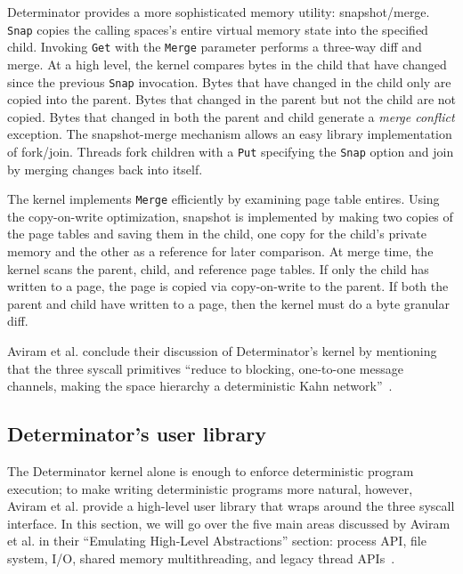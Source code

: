 Determinator provides a more sophisticated memory utility: snapshot/merge.
{\tt Snap} copies the calling spaces's entire virtual memory state into the
specified child. Invoking {\tt Get} with the {\tt Merge} parameter performs a
three-way diff and merge. At a high level, the kernel compares bytes
in the child that have changed since the previous {\tt Snap} invocation. Bytes
that have changed in the child only are copied into the parent. Bytes that
changed in the parent but not the child are not copied.
Bytes that changed in both the parent and child generate a
\emph{merge conflict} exception. The snapshot-merge mechanism allows an easy
library implementation of fork/join. Threads fork children with a
{\tt Put} specifying the {\tt Snap} option and join by merging changes back into
itself.

The kernel implements {\tt Merge} efficiently by examining page table entires.
Using the copy-on-write optimization, snapshot is implemented by making two
copies of the page tables and saving them in the child, one copy for the child's
private memory and the other as a reference for later comparison. At merge time,
the kernel scans the parent, child, and reference page tables. If only the child
has written to a page, the page is copied via copy-on-write to the parent. If
both the parent and child have written to a page, then the kernel must do a byte
granular diff.

Aviram et al. conclude their discussion of Determinator's kernel by mentioning
that the three syscall primitives ``reduce to blocking, one-to-one message
channels, making the space hierarchy a deterministic Kahn
network''~\cite{Aviram10,kahn1974semantics}.

\subsection{Determinator's user library}

The Determinator kernel alone is enough to enforce deterministic program
execution; to make writing deterministic programs more natural, however, Aviram
et al. provide a high-level user library that wraps around the three syscall
interface. In this section, we will go over
the five main areas discussed by Aviram et al. in their ``Emulating High-Level
Abstractions'' section: process API, file system, I/O, shared memory
multithreading, and legacy thread APIs~\cite{Aviram10}.

